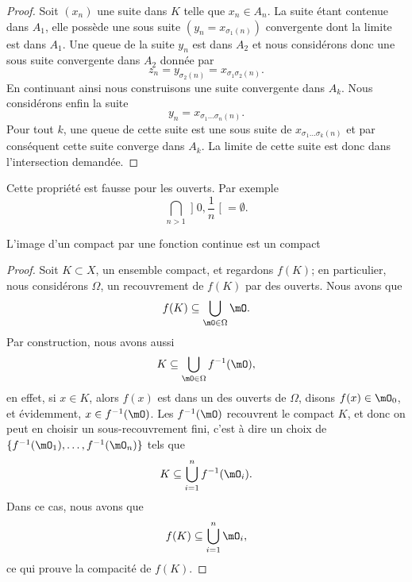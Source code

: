\begin{proof}
    Soit \( (x_n)\) une suite dans \( K\) telle que \( x_n\in A_n\). La suite étant contenue dans \( A_1\), elle possède une sous suite \( (y_n=x_{\sigma_1(n)})\) convergente dont la limite est dans \( A_1\). Une queue de la suite \( y_n\) est dans \( A_2\) et nous considérons donc une sous suite convergente dans \( A_2\) donnée par
    \begin{equation}
        z_n=y_{\sigma_2(n)}=x_{\sigma_1\sigma_2(n)}.
    \end{equation}
    En continuant ainsi nous construisons une suite convergente dans \( A_k\). Nous considérons enfin la suite
    \begin{equation}
        y_n=x_{\sigma_1\ldots \sigma_n(n)}.
    \end{equation}
    Pour tout \( k\), une queue de cette suite est une sous suite de \( x_{\sigma_1\ldots \sigma_k(n)}\) et par conséquent cette suite converge dans \( A_k\). La limite de cette suite est donc dans l'intersection demandée.
\end{proof}

\begin{remark}
    Cette propriété est fausse pour les ouverts. Par exemple
    \begin{equation}
        \bigcap_{n>1}\mathopen] 0 , \frac{1}{ n } \mathclose[=\emptyset.
    \end{equation}
\end{remark}


\begin{theorem}     \label{ThoImCompCotComp}
L'image d'un compact par une fonction continue est un compact
\end{theorem}

\begin{proof}
    Soit $K\subset X$, un ensemble compact, et regardons $f(K)$; en particulier, nous considérons $\Omega$, un recouvrement de $f(K)$ par des ouverts. Nous avons que
    \begin{equation}
        f(K)\subseteq\bigcup_{\mO\in\Omega}\mO.
    \end{equation}
    Par construction, nous avons aussi
    \begin{equation}
        K\subseteq\bigcup_{\mO\in\Omega}f^{-1}(\mO),
    \end{equation}
    en effet, si $x\in K$, alors $f(x)$ est dans un des ouverts de $\Omega$, disons $f(x)\in \mO_0$, et évidemment, $x\in f^{-1}(\mO)$.  Les $f^{-1}(\mO)$ recouvrent le compact $K$, et donc on peut en choisir un sous-recouvrement fini, c'est à dire un choix de $\{ f^{-1}(\mO_1),\ldots,f^{-1}(\mO_n) \}$ tels que
    \begin{equation}
        K\subseteq \bigcup_{i=1}^nf^{-1}(\mO_i).
    \end{equation}
    Dans ce cas, nous avons que
    \begin{equation}
        f(K)\subseteq\bigcup_{i=1}^n\mO_i,
    \end{equation}
    ce qui prouve la compacité de $f(K)$.
\end{proof}

